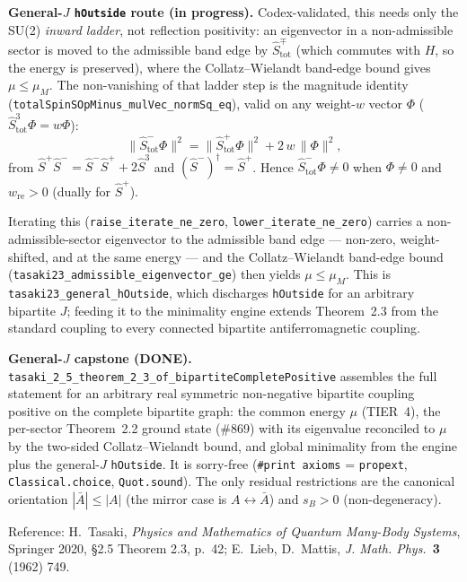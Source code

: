 \documentclass[a4paper,11pt]{article}
\begin{document}
\textbf{General-\(J\) \texttt{hOutside} route (in progress).} Codex-validated,
this needs only the SU(2) \emph{inward ladder}, not reflection positivity:
an eigenvector in a non-admissible sector is moved to the admissible band
edge by \(\hat S^\mp_{\mathrm{tot}}\) (which commutes with \(H\), so the
energy is preserved), where the Collatz--Wielandt band-edge bound gives
\(\mu\le\mu_M\).  The non-vanishing of that ladder step is the magnitude
identity (\texttt{totalSpinSOpMinus\_mulVec\_normSq\_eq}), valid on any
weight-\(w\) vector \(\Phi\) (\(\hat S^3_{\mathrm{tot}}\Phi=w\Phi\)):
\[
  \|\hat S^-_{\mathrm{tot}}\Phi\|^2
    = \|\hat S^+_{\mathrm{tot}}\Phi\|^2 + 2\,w\,\|\Phi\|^2,
\]
from \(\hat S^+\hat S^- = \hat S^-\hat S^+ + 2\hat S^3\) and
\((\hat S^-)^\dagger=\hat S^+\).  Hence \(\hat S^-_{\mathrm{tot}}\Phi\neq0\)
when \(\Phi\neq0\) and \(w_{\mathrm{re}}>0\) (dually for \(\hat S^+\)).

Iterating this (\texttt{raise\_iterate\_ne\_zero},
\texttt{lower\_iterate\_ne\_zero}) carries a non-admissible-sector
eigenvector to the admissible band edge --- non-zero, weight-shifted, and
at the same energy --- and the Collatz--Wielandt band-edge bound
(\texttt{tasaki23\_admissible\_eigenvector\_ge}) then yields
\(\mu\le\mu_M\).  This is \texttt{tasaki23\_general\_hOutside}, which
discharges \texttt{hOutside} for an arbitrary bipartite \(J\); feeding it
to the minimality engine extends Theorem~2.3 from the standard coupling to
every connected bipartite antiferromagnetic coupling.

\textbf{General-\(J\) capstone (DONE).}
\texttt{tasaki\_2\_5\_theorem\_2\_3\_of\_bipartiteCompletePositive} assembles
the full statement for an arbitrary real symmetric non-negative bipartite
coupling positive on the complete bipartite graph: the common energy
\(\mu\) (TIER~4), the per-sector Theorem~2.2 ground state (\#869) with its
eigenvalue reconciled to \(\mu\) by the two-sided Collatz--Wielandt bound,
and global minimality from the engine plus the general-\(J\)
\texttt{hOutside}.  It is sorry-free (\texttt{\#print axioms} =
\texttt{propext}, \texttt{Classical.choice}, \texttt{Quot.sound}).  The only
residual restrictions are the canonical orientation \(|\bar A|\le|A|\) (the
mirror case is \(A\leftrightarrow\bar A\)) and \(s_B>0\) (non-degeneracy).

Reference: H.\ Tasaki, \emph{Physics and Mathematics of Quantum
Many-Body Systems}, Springer 2020, §2.5 Theorem 2.3, p.~42;
E.\ Lieb, D.\ Mattis, \emph{J. Math. Phys.}\ \textbf{3} (1962) 749.
\end{document}
